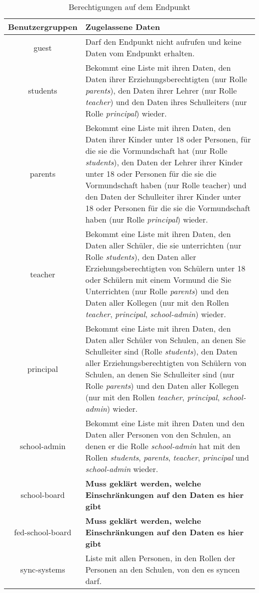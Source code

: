 \begin{table}[htb]
	\begin{tabularx}{\textwidth}{|c|X|}
		\hline
\textbf{Benutzergruppen} & \textbf{Zugelassene Daten} \\ \hline
guest & Darf den Endpunkt nicht aufrufen und keine Daten vom Endpunkt erhalten. \\ \hline
students & Bekommt eine Liste mit ihren Daten, 
           den Daten ihrer Erziehungsberechtigten (nur Rolle \textit{parents}), 
					 den Daten ihrer Lehrer (nur Rolle \textit{teacher}) und 
					 den Daten ihres Schulleiters (nur Rolle \textit{principal}) wieder.\\ \hline
parents & Bekommt eine Liste mit ihren Daten, 
          den Daten ihrer Kinder unter 18 oder Personen, für die sie die Vormundschaft hat (nur Rolle \textit{students}), 
					den Daten der Lehrer ihrer Kinder unter 18 oder Personen für die sie die Vormundschaft haben (nur Rolle teacher) und
					den Daten der Schulleiter ihrer Kinder unter 18 oder Personen für die sie die Vormundschaft haben (nur Rolle \textit{principal})
					wieder.\\ \hline
teacher & Bekommt eine Liste mit ihren Daten, 
          den Daten aller Schüler, die sie unterrichten (nur Rolle \textit{students}),
					den Daten aller Erziehungsberechtigten von Schülern unter 18 oder Schülern mit einem Vormund die Sie Unterrichten (nur Rolle \textit{parents}) und
					den Daten aller Kollegen (nur mit den Rollen \textit{teacher}, \textit{principal}, \textit{school-admin}) 
					wieder.\\ \hline
principal & Bekommt eine Liste mit ihren Daten,
            den Daten aller Schüler von Schulen, an denen Sie Schulleiter sind (Rolle \textit{students}),
						den Daten aller Erziehungsberechtigten von Schülern von Schulen, an denen Sie Schulleiter sind (nur Rolle \textit{parents}) und
					  den Daten aller Kollegen (nur mit den Rollen \textit{teacher}, \textit{principal}, \textit{school-admin})
						wieder.\\ \hline
school-admin & Bekommt eine Liste mit ihren Daten und
               den Daten aller Personen von den Schulen, an denen er die Rolle \textit{school-admin} hat mit den Rollen \textit{students}, \textit{parents}, \textit{teacher}, \textit{principal} und \textit{school-admin} wieder.  \\ \hline
school-board & \textcolor[rgb]{1,0.41,0.13}{\textbf{Muss geklärt werden, welche Einschränkungen auf den Daten es hier gibt}} \\ \hline
fed-school-board & \textcolor[rgb]{1,0.41,0.13}{\textbf{Muss geklärt werden, welche Einschränkungen auf den Daten es hier gibt}} \\ \hline
sync-systems & Liste mit allen Personen, in den Rollen der Personen an den Schulen, von den es syncen darf. \\ \hline

	\end{tabularx}

		\caption{Berechtigungen auf dem Endpunkt}
		\label{tab:end:rest:api:school:users:get:right}
\end{table}